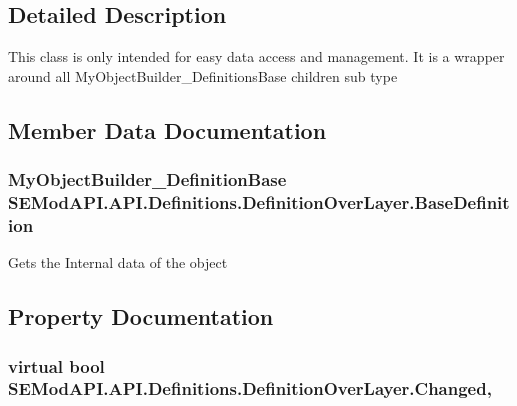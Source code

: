 \subsection{Detailed Description}
This class is only intended for easy data access and management. It is a wrapper around all My\+Object\+Builder\+\_\+\+Definitions\+Base children sub type 



\subsection{Member Data Documentation}
\hypertarget{class_s_e_mod_a_p_i_1_1_a_p_i_1_1_definitions_1_1_definition_over_layer_a9ef44b7d179c2f5486a5f2a8f7e7b26f}{}
\subsubsection[{Base\+Definition}]{\setlength{\rightskip}{0pt plus 5cm}My\+Object\+Builder\+\_\+\+Definition\+Base S\+E\+Mod\+A\+P\+I.\+A\+P\+I.\+Definitions.\+Definition\+Over\+Layer.\+Base\+Definition\hspace{0.3cm}{\ttfamily [protected]}}\label{class_s_e_mod_a_p_i_1_1_a_p_i_1_1_definitions_1_1_definition_over_layer_a9ef44b7d179c2f5486a5f2a8f7e7b26f}


Gets the Internal data of the object 



\subsection{Property Documentation}
\hypertarget{class_s_e_mod_a_p_i_1_1_a_p_i_1_1_definitions_1_1_definition_over_layer_a835702eee631ba8c4c997f3f381f0f64}{}
\subsubsection[{Changed}]{\setlength{\rightskip}{0pt plus 5cm}virtual bool S\+E\+Mod\+A\+P\+I.\+A\+P\+I.\+Definitions.\+Definition\+Over\+Layer.\+Changed\hspace{0.3cm}{\ttfamily [get]}, {}}\label{class_s_e_mod_a_p_i_1_1_a_p_i_1_1_definitions_1_1_definition_over_layer_a835702eee631ba8c4c997f3f381f0f64}


